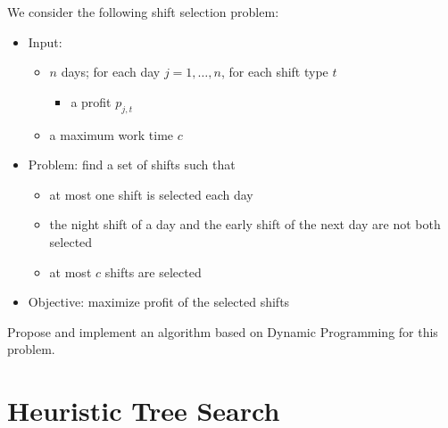 \documentclass[a4paper,twocolumn]{article}
\begin{document}
We consider the following shift selection problem:
\begin{itemize}
  \item Input:
    \begin{itemize}
      \item $n$ days; for each day $j = 1, \dots, n$, for each shift type $t$
        \begin{itemize}
          \item a profit $p_{j, t}$
        \end{itemize}
      \item a maximum work time $c$
    \end{itemize}
  \item Problem: find a set of shifts such that
    \begin{itemize}
      \item at most one shift is selected each day
      \item the night shift of a day and the early shift of the next day are not both selected
      \item at most $c$ shifts are selected
    \end{itemize}
  \item Objective: maximize profit of the selected shifts
\end{itemize}

Propose and implement an algorithm based on Dynamic Programming for this problem.

\section{Heuristic Tree Search}
\end{document}
